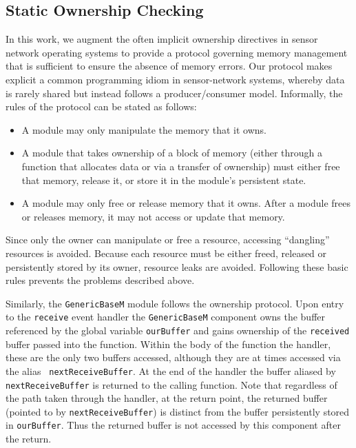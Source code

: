 
\subsection{Static Ownership Checking}

In this work, we augment the often implicit ownership directives in
sensor network operating systems to provide a protocol governing
memory management that is sufficient to ensure the absence of memory
errors.  Our protocol makes explicit a common programming idiom in
sensor-network systems, whereby data is rarely shared but instead
follows a producer/consumer model.  
%
Informally, the rules of the protocol can be stated as follows:
%
\begin{itemize}
%
\item A module may only manipulate the memory that it owns.
%
\item A module that takes ownership of a block of memory (either
through a function that allocates data or via a transfer of ownership)
must either free that memory, release it, or store it in the module's
persistent state.
%
\item A module may only free or release memory that it owns.  After a
module frees or releases memory, it may not access or update that
memory.
%
\end{itemize}
%
Since only the owner can manipulate or free a resource, accessing
``dangling'' resources is avoided.  Because each resource must be
either freed, released or persistently stored by its owner, resource 
leaks are avoided.  
%
Following these basic rules prevents the problems described above.



\smallskip{}


Similarly, the {\tt GenericBaseM} module follows the
ownership protocol. Upon entry to the {\tt receive}
event handler the {\tt GenericBaseM} component owns the buffer
referenced by the global variable {\tt ourBuffer} and gains ownership
of the {\tt received} buffer passed into the function.  Within the
body of the function the handler, these are the only two buffers
accessed, although they are at times accessed via the alias {\tt
nextReceiveBuffer}.  At the end of the handler the buffer aliased by
{\tt nextReceiveBuffer} is returned to the calling function.  Note
that regardless of the path taken through the handler, at the 
return point, the returned buffer (pointed to by {\tt nextReceiveBuffer})
is distinct from the buffer persistently
stored in {\tt ourBuffer}.  Thus the returned buffer is not accessed
by this component after the return.





